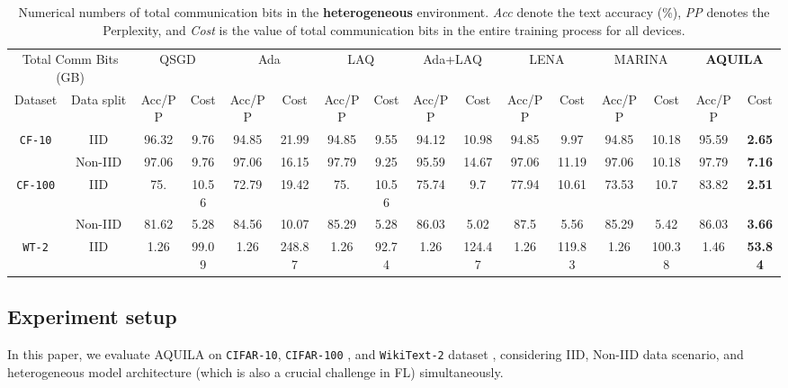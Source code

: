\documentclass[lettersize,journal]{IEEEtran}
\begin{document}
\begin{table*}[htbp]
\renewcommand\arraystretch{2.0}
\tabcolsep=0.12cm
\centering
\caption{Numerical numbers of total communication bits in the \textbf{heterogeneous} environment. \textit{Acc} denote the text accuracy (\%), \textit{PP} denotes the Perplexity, and \textit{Cost} is the value of total communication bits in the entire training process for all devices.}
\label{hetero_table}
\begin{tabular}{cc|cc|cc|cc|cc|cc|cc|cc}
\hline
\multicolumn{2}{c|}{Total Comm Bits (GB)} & \multicolumn{2}{c|}{QSGD} & \multicolumn{2}{c|}{Ada} & \multicolumn{2}{c|}{LAQ} & \multicolumn{2}{c|}{Ada+LAQ} & \multicolumn{2}{c|}{LENA} & \multicolumn{2}{c|}{MARINA} & \multicolumn{2}{c}{\textbf{AQUILA}} \\ %
Dataset & Data split & Acc/PP & Cost & Acc/PP & Cost & Acc/PP & Cost & Acc/PP & Cost & Acc/PP & Cost & Acc/PP & Cost & Acc/PP & Cost \\ \hline
\multirow{2}{*}{\texttt{CF-10}} & IID & 96.32 & 9.76 & 94.85 & 21.99 & 94.85 & 9.55 & 94.12 & 10.98 & 94.85 & 9.97 & 94.85 & 10.18 & 95.59 & \textbf{2.65} \\
 & Non-IID & 97.06 & 9.76 & 97.06 & 16.15 & 97.79 & 9.25 & 95.59 & 14.67 & 97.06 & 11.19 & 97.06 & 10.18 & 97.79 & \textbf{7.16} \\ \hline
\multirow{2}{*}{\texttt{CF-100}} & IID & 75. & 10.56 & 72.79 & 19.42 & 75. & 10.56 & 75.74 & 9.7 & 77.94 & 10.61 & 73.53 & 10.7 & 83.82 & \textbf{2.51} \\
 & Non-IID & 81.62 & 5.28 & 84.56 & 10.07 & 85.29 & 5.28 & 86.03 & 5.02 & 87.5 & 5.56 & 85.29 & 5.42 & 86.03 & \textbf{3.66} \\ \hline
\texttt{WT-2} & IID & 1.26 & 99.09 & 1.26 & 248.87 & 1.26 & 92.74 & 1.26 & 124.47 & 1.26 & 119.83 & 1.26 & 100.38 & 1.46 & \textbf{53.84} \\ \hline
\end{tabular}
\end{table*}


\subsection{Experiment setup}

In this paper, we evaluate AQUILA on \texttt{CIFAR-10}, \texttt{CIFAR-100} \cite{krizhevsky2009learning}, and \texttt{WikiText-2} dataset \cite{merity2016pointer}, considering IID, Non-IID data scenario, and heterogeneous model architecture (which is also a crucial challenge in FL) simultaneously.
\end{document}
